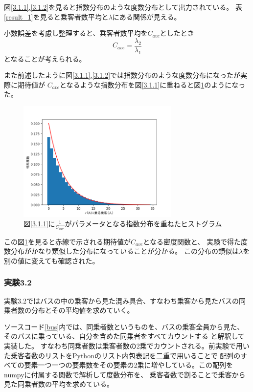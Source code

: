 \documentclass[a4paper,11pt,dvipdfmx]{jsarticle}
\begin{document}
図\ref{3.1.1},\ref{3.1.2}を見ると指数分布のような度数分布として出力されている。
表\ref{result_1}を見ると乗客者数平均と$\lambda$にある関係が見える。

小数誤差を考慮し整理すると、乗客者数平均を$C_{ave}$としたとき
\begin{equation}
    C_{ave} = \frac{\lambda_2}{\lambda_1}
\end{equation}
となることが考えられる。

また前述したように図\ref{3.1.1},\ref{3.1.2}では指数分布のような度数分布になったが実際に期待値が
$C_{ave}$となるような指数分布を図\ref{3.1.1}に重ねると図\ref{3.1.3}のようになった。
\begin{figure}[h]
    \centering
    \includegraphics[width=80mm]{./Bus_cus_2_10_exp.png}
    \caption{図\ref{3.1.1}に$\frac{1}{C_{ave}}$がパラメータとなる指数分布を重ねたヒストグラム}
    \label{3.1.3}
\end{figure}

この図\ref{3.1.3}を見ると赤線で示される期待値が$C_{ave}$となる密度関数と、
実験で得た度数分布がかなり類似した分布になっていることが分かる。
この分布の類似は$\lambda$を別の値に変えても確認された。

\subsubsection{実験3.2}
実験3.2ではバスの中の乗客から見た混み具合、すなわち乗客から見たバスの同乗者数の分布とその平均値を求めていく。

ソースコード\ref{bus}内では、同乗者数というものを、バスの乗客全員から見た、そのバスに乗っている、自分を含めた同乗者をすべてカウントする
と解釈して実装した。
すなわち同乗者数は乗客者数の2乗でカウントされる。前実験で用いた乗客者数のリストをPythonのリスト内包表記を二重で用いることで
配列のすべての要素一つ一つの要素数をその要素の2乗に増やしている。この配列をnumpyに付属する関数で解析して度数分布を、
乗客者数で割ることで乗客から見た同乗者数の平均を求めている。
\end{document}
